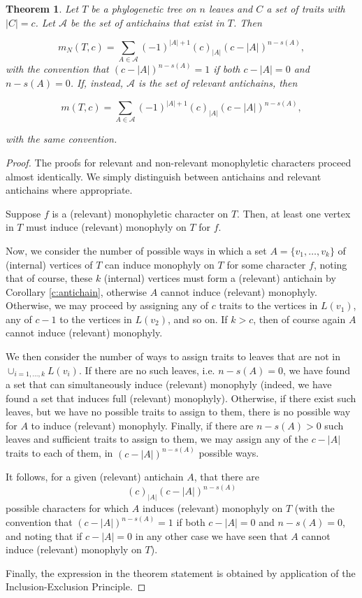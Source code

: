 \documentclass{amsart}
\newtheorem{theorem}{Theorem}
\theoremstyle{definition}
\begin{document}
\begin{theorem}
\label{thm:gen.theorem}
    Let $T$ be a phylogenetic tree on $n$ leaves and $C$ a set of traits with $|C|=c$. Let $\mathcal{A}$ be the set of antichains that exist in $T$. Then

    \[m_N(T,c) = \sum_{A \in \mathcal{A}} (-1)^{|A|+1} (c)_{|A|} (c-|A|)^{n-s(A)},\]
with the convention that $(c-|A|)^{n-s(A)}=1$ if both $c-|A|=0$ and $n-s(A)=0$. If, instead, $\mathcal{A}$ is the set of relevant antichains, then 

\[m(T,c) = \sum_{A \in \mathcal{A}} (-1)^{|A|+1} (c)_{|A|} (c-|A|)^{n-s(A)},\]

with the same convention.
\end{theorem}

\begin{proof}
The proofs for relevant and non-relevant monophyletic characters proceed almost identically. We simply distinguish between antichains and relevant antichains where appropriate. 

Suppose $f$ is a (relevant) monophyletic character on $T$. Then, at least one vertex in $T$ must induce (relevant) monophyly on $T$ for $f$.

Now, we consider the number of possible ways in which a set $A=\{v_1,\dots,v_k\}$ of (internal) vertices of $T$ can induce monophyly on $T$ for some character $f$, noting that of course, these $k$ (internal) vertices must form a (relevant) antichain by Corollary \ref{c:antichain}, otherwise $A$ cannot induce (relevant) monophyly. Otherwise, we may proceed by assigning any of $c$ traits to the vertices in $L(v_1)$, any of $c-1$ to the vertices in $L(v_2)$, and so on. If $k>c$, then of course again $A$ cannot induce (relevant) monophyly. 

We then consider the number of ways to assign traits to leaves that are not in $\cup_{i=1,\dots,k} L(v_i)$. If there are no such leaves, i.e. $n-s(A)=0$, we have found a set that can simultaneously induce (relevant) monophyly (indeed, we have found a set that induces full (relevant) monophyly).
Otherwise, if there exist such leaves, but we have no possible traits to assign to them, there is no possible way for $A$ to induce (relevant) monophyly. Finally, if there are $n-s(A)>0$ such leaves and sufficient traits to assign to them, we may assign any of the $c-|A|$ traits to each of them, in $(c-|A|)^{n-s(A)}$ possible ways.

It follows, for a given (relevant) antichain $A$, that there are 
\[ (c)_{|A|} (c-|A|)^{n-s(A)}\]
possible characters for which $A$ induces (relevant) monophyly on $T$ (with the convention that $(c-|A|)^{n-s(A)}=1$ if both $c-|A|=0$ and $n-s(A)=0$, and noting that if $c-|A|=0$ in any other case we have seen that $A$ cannot induce (relevant) monophyly on $T$).

Finally, the expression in the theorem statement is obtained by application of the Inclusion-Exclusion Principle.
\end{proof}
\end{document}
